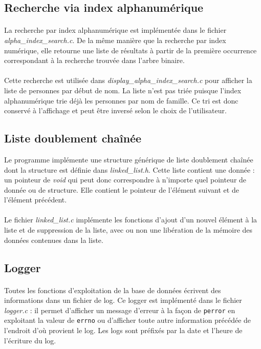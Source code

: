 \documentclass{article}
\begin{document}
    \subsection{Recherche via index alphanumérique}
    \paragraph{}
    La recherche par index alphanumérique est implémentée dans le fichier \emph{alpha\_index\_search.c}. De la même manière que la recherche par index numérique, elle retourne une liste de résultats à partir de la première occurrence correspondant à la recherche trouvée dans l'arbre binaire.

    \paragraph{}
    Cette recherche est utilisée dans \emph{display\_alpha\_index\_search.c} pour afficher la liste de personnes par début de nom. La liste n'est pas triée puisque l'index alphanumérique trie déjà les personnes par nom de famille. Ce tri est donc conservé à l'affichage et peut être inversé selon le choix de l'utilisateur.


    \subsection{Liste doublement chaînée}
    Le programme implémente une structure générique de liste doublement chaînée dont la structure est définie dans \emph{linked\_list.h}. Cette liste contient une donnée : un pointeur de \emph{void} qui peut donc correspondre à n'importe quel pointeur de donnée ou de structure. Elle contient le pointeur de l'élément suivant et de l'élément précédent.

    \paragraph{}
    Le fichier \emph{linked\_list.c} implémente les fonctions d'ajout d'un nouvel élément à la liste et de suppression de la liste, avec ou non une libération de la mémoire des données contenues dans la liste.


    \subsection{Logger}
    \paragraph{}
    Toutes les fonctions d'exploitation de la base de données écrivent des informations dans un fichier de log. Ce logger est implémenté dans le fichier \emph{logger.c} : il permet d'afficher un message d'erreur à la façon de \texttt{perror} en exploitant la valeur de \texttt{errno} ou d'afficher toute autre information précédée de l'endroit d'où provient le log. Les logs sont préfixés par la date et l'heure de l'écriture du log.
\end{document}
